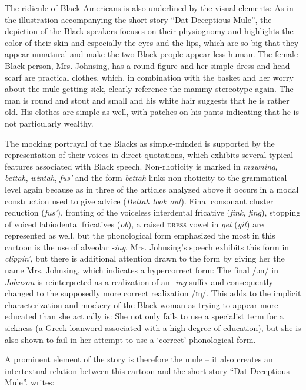 The ridicule of Black Americans is also underlined by the visual elements: As in the illustration accompanying the short story “Dat Deceptious Mule”, the depiction of the Black speakers focuses on their physiognomy and highlights the color of their skin and especially the eyes and the lips, which are so big that they appear unnatural and make the two Black people appear less human. The female Black person, Mrs. Johnsing, has a round figure and her simple dress and head scarf are practical clothes, which, in combination with the basket and her worry about the mule getting sick, clearly reference the mammy stereotype again. The man is round and stout and small and his white hair suggests that he is rather old. His clothes are simple as well, with patches on his pants indicating that he is not particularly wealthy.

The mocking portrayal of the Blacks as simple-minded is supported by the representation of their voices in direct quotations, which exhibits several typical features associated with Black speech. Non-rhoticity is marked in \emph{mawning}, \emph{bettah}, \emph{wintah}, \emph{fus’} and the form \emph{bettah} links non-rhoticity to the grammatical level again because as in three of the articles analyzed above it occurs in a modal construction used to give advice (\textit{Bettah look out}). Final consonant cluster reduction (\emph{fus’}), fronting of the voiceless interdental fricative (\emph{fink}, \emph{fing}), stopping of voiced labiodental fricatives (\emph{ob}), a raised \textsc{dress} vowel in \emph{get} (\emph{git}) are represented as well, but the phonological form emphasized the most in this cartoon is the use of alveolar \emph{-ing}. Mrs. Johnsing’s speech exhibits this form in \emph{clippin’}, but there is additional attention drawn to the form by giving her the name Mrs. Johnsing, which indicates a hypercorrect form: The final /ən/ in \emph{Johnson} is reinterpreted as a realization of an -\emph{ing} suffix and consequently changed to the supposedly more correct realization /ɪŋ/. This adds to the implicit characterization and mockery of the Black woman as trying to appear more educated than she actually is: She not only fails to use a specialist term for a sickness (a Greek loanword associated with a high degree of education), but she is also shown to fail in her attempt to use a ‘correct’ phonological form.

A prominent element of the story is therefore the mule – it also creates an intertextual relation between this cartoon and the short story “Dat Deceptious Mule”. \citet[332]{Ferris2009} writes:

